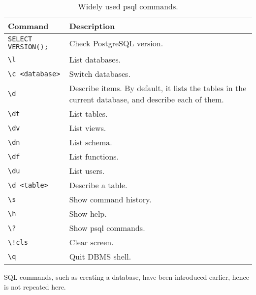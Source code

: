 \begin{table}
	\centering \caption{Widely used psql commands.}\label{ch:db:tab:psqlcommands}
	\begin{tabularx}{\textwidth}{lX}
		\hline
		Command & Description \\ \hline
		\verb|SELECT VERSION();| & Check PostgreSQL version. \\ 
		\verb|\l| & List databases. \\ 
		\verb|\c <database>| & Switch databases. \\ 
		\verb|\d| & Describe items. By default, it lists the tables in the current database, and describe each of them. \\ 
		\verb|\dt| & List tables. \\ 
		\verb|\dv| & List views. \\ 
		\verb|\dn| & List schema. \\ 
		\verb|\df| & List functions. \\ 
		\verb|\du| & List users. \\ 
		\verb|\d <table>| & Describe a table. \\ 
		\verb|\s| & Show command history. \\ 
		\verb|\h| & Show help. \\ 
		\verb|\?| & Show psql commands. \\ 
		\verb|\!cls| & Clear screen. \\ 
		\verb|\q| & Quit DBMS shell. \\
		\hline
	\end{tabularx}
\end{table}

SQL commands, such as creating a database, have been introduced earlier, hence is not repeated here. 